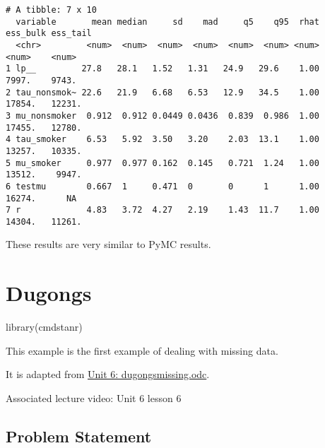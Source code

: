 \documentclass[
  letterpaper,
  DIV=11,
  numbers=noendperiod]{scrreprt}
\newenvironment{Shaded}{\begin{snugshade}}{\end{snugshade}}
\newcommand{\FunctionTok}[1]{\textcolor[rgb]{0.28,0.35,0.67}{#1}}
\newcommand{\NormalTok}[1]{\textcolor[rgb]{0.00,0.23,0.31}{#1}}
\newcommand{\SpecialCharTok}[1]{\textcolor[rgb]{0.37,0.37,0.37}{#1}}
\begin{document}
\begin{Shaded}
\end{Shaded}

\begin{verbatim}
# A tibble: 7 x 10
  variable       mean median     sd    mad     q5    q95  rhat ess_bulk ess_tail
  <chr>         <num>  <num>  <num>  <num>  <num>  <num> <num>    <num>    <num>
1 lp__         27.8   28.1   1.52   1.31   24.9   29.6    1.00    7997.    9743.
2 tau_nonsmok~ 22.6   21.9   6.68   6.53   12.9   34.5    1.00   17854.   12231.
3 mu_nonsmoker  0.912  0.912 0.0449 0.0436  0.839  0.986  1.00   17455.   12780.
4 tau_smoker    6.53   5.92  3.50   3.20    2.03  13.1    1.00   13257.   10335.
5 mu_smoker     0.977  0.977 0.162  0.145   0.721  1.24   1.00   13512.    9947.
6 testmu        0.667  1     0.471  0       0      1      1.00   16274.      NA 
7 r             4.83   3.72  4.27   2.19    1.43  11.7    1.00   14304.   11261.
\end{verbatim}

These results are very similar to PyMC results.

\hypertarget{dugongs}{%
\chapter*{Dugongs}\label{dugongs}}


\begin{Shaded}
\begin{Highlighting}[]
\FunctionTok{library}\NormalTok{(cmdstanr)}
\end{Highlighting}
\end{Shaded}

This example is the first example of dealing with missing data.

It is adapted from \href{../odc_files/unit6/dugongsmissing.odc}{Unit 6:
dugongsmissing.odc}.

Associated lecture video: Unit 6 lesson 6

\hypertarget{problem-statement-1}{%
\section*{Problem Statement}\label{problem-statement-1}}
\end{document}
